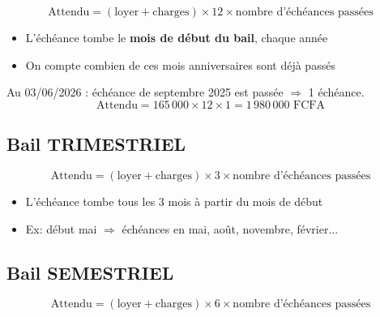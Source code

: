 \documentclass[a4paper,12pt]{article}
\begin{document}
\begin{formulebox}
\begin{equation}
\text{Attendu} = (\text{loyer} + \text{charges}) \times 12 \times \text{nombre d'échéances passées}
\end{equation}
\vspace{-0.3cm}
\begin{itemize}[noitemsep]
  \item L'échéance tombe le \textbf{mois de début du bail}, chaque année
  \item On compte combien de ces mois anniversaires sont déjà passés
\end{itemize}
\end{formulebox}

\begin{exemplebox}
Au 03/06/2026 : échéance de septembre 2025 est passée $\Rightarrow$ 1 échéance.
$$\text{Attendu} = 165\,000 \times 12 \times 1 = 1\,980\,000 \text{ FCFA}$$
\end{exemplebox}

\subsection{Bail TRIMESTRIEL}

\begin{formulebox}
\begin{equation}
\text{Attendu} = (\text{loyer} + \text{charges}) \times 3 \times \text{nombre d'échéances passées}
\end{equation}
\vspace{-0.3cm}
\begin{itemize}[noitemsep]
  \item L'échéance tombe tous les 3 mois à partir du mois de début
  \item Ex: début mai $\Rightarrow$ échéances en mai, août, novembre, février...
\end{itemize}
\end{formulebox}

\subsection{Bail SEMESTRIEL}

\begin{formulebox}
\begin{equation}
\text{Attendu} = (\text{loyer} + \text{charges}) \times 6 \times \text{nombre d'échéances passées}
\end{equation}
\end{formulebox}
\end{document}
